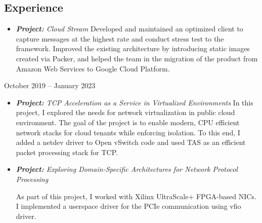 \documentclass[../main.tex]{subfiles}
\begin{document}
  \begin{category}
    \section{Experience}
      \begin{itemize}
        \item \emph{\textbf{Project:} Cloud Stream}
        Developed and maintained an optimized client
        to capture messages at the highest rate and conduct stress 
        test to the framework. 
        Improved the existing architecture by introducing static images 
        created via Packer, and helped the team 
        in the migration of the product from Amazon Web Services to Google 
        Cloud Platform.
      \end{itemize}

     \strut\hfill October 2019 -- January 2023\\[-9pt]
      \begin{itemize}
        \item \emph{\textbf{Project:} 
          TCP Acceleration as a Service in Virtualized Environments
        }
        In this project, I explored the needs for network 
        virtualization in public cloud environment. The 
        goal of the project is to enable modern, CPU efficient 
        network stacks for cloud tenants while enforcing 
        isolation. To this end, I added a netdev driver to 
        Open vSwitch code and used TAS as an efficient
        packet processing stack for TCP.

        \item \emph{\textbf{Project:} 
          Exploring Domain-Specific Architectures 
          for Network Protocol Processing
        } 

        As part of this project, I worked with 
        Xilinx UltraScale+ FPGA-based NICs. I implemented a 
        userspace driver for the PCIe communication using 
        vfio driver.


\end{itemize}
\end{category}
\end{document}
